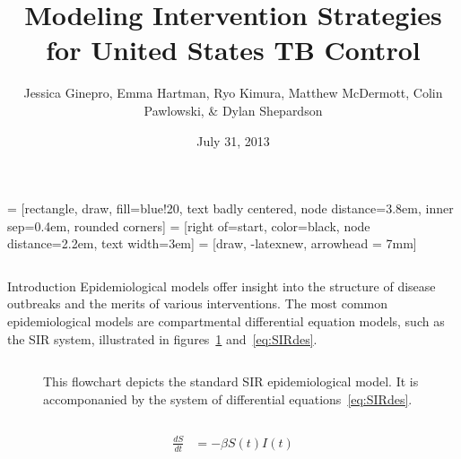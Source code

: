 \documentclass[final]{beamer}
\title{\huge Modeling Intervention Strategies for United States TB Control}
\author{Jessica Ginepro, Emma Hartman, Ryo Kimura, Matthew McDermott, Colin
        Pawlowski, \& Dylan Shepardson}
\institute[MHC]{Mathematical Modeling Group, Mount Holyoke College, South
                Hadley, MA, USA}
\date[July 31, 2013]{July 31, 2013}
\begin{document}
 = [rectangle, draw, fill=blue!20, text badly centered,
  node distance=3.8em, inner sep=0.4em, rounded corners]
 = [right of=start, color=black, node distance=2.2em,
text width=3em]
 = [draw, -latexnew, arrowhead = 7mm]


\begin{frame}
  \begin{columns}
    \begin{column}{.3\textwidth}
      \vspace{-3em}
      \begin{block}{Introduction}
        Epidemiological models offer insight into the structure of disease
        outbreaks and the merits of various interventions. The most common
        epidemiological models are compartmental differential equation models,
        such as the SIR system, illustrated in figures~\ref{fig:SIRFlowchart}
        and~\ref{eq:SIRdes}. 
        \begin{block}{}
          \begin{column}{.39\textwidth}
            \begin{figure}[h]
              \begin{center}
              \end{center}
              \caption{This flowchart depicts the standard SIR epidemiological
                       model. It is accomponanied by the system of differential
                       equations~\ref{eq:SIRdes}.}
              \label{fig:SIRFlowchart}
            \end{figure}
          \end{column}
          \begin{column}{.39\textwidth}
            \begin{figure}[h]
              \begin{align*}
                \frac{dS}{dt} &= -\beta S(t)I(t) \\

\end{align*}
\end{figure}
\end{column}
\end{block}
\end{block}
\end{column}
\end{columns}
\end{frame}
\end{document}
